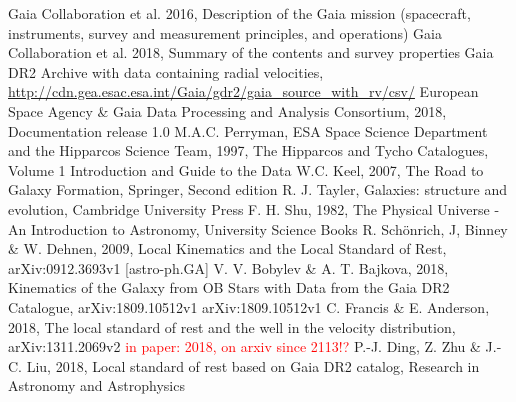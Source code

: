 \documentclass{aastex62}
\begin{document}
	\begin{thebibliography}{}
		
		 Gaia Collaboration et al. 2016, Description of the Gaia mission (spacecraft, instruments, survey and measurement principles, and operations)
		Gaia Collaboration et al. 2018, Summary of the contents and survey properties
		 Gaia DR2 Archive with data containing radial velocities, \url{http://cdn.gea.esac.esa.int/Gaia/gdr2/gaia_source_with_rv/csv/}
		 European Space Agency \& Gaia Data Processing and Analysis Consortium, 2018, Documentation release 1.0
		 M.A.C. Perryman, ESA Space Science Department and the Hipparcos Science Team, 1997, The Hipparcos and Tycho Catalogues, Volume 1 Introduction and Guide to the Data
		W.C. Keel, 2007, The Road to Galaxy Formation, Springer, Second edition
		 R. J. Tayler, Galaxies: structure and evolution, Cambridge University Press
		 F. H. Shu, 1982, The Physical Universe - An Introduction to Astronomy, University Science Books
		 R. Sch\"{o}nrich, J, Binney \& W. Dehnen, 2009, Local Kinematics and the Local Standard of Rest, arXiv:0912.3693v1 [astro-ph.GA]
		 V. V. Bobylev \& A. T. Bajkova, 2018, Kinematics of the Galaxy from OB Stars with Data from the Gaia DR2 Catalogue, arXiv:1809.10512v1 arXiv:1809.10512v1
		 C. Francis \& E. Anderson, 2018, The local standard of rest and the well in the velocity distribution, arXiv:1311.2069v2 \textcolor{red}{in paper: 2018, on arxiv since 2113!?}
		 P.-J. Ding, Z. Zhu \& J.-C. Liu, 2018, Local standard of rest based on Gaia DR2 catalog, Research in Astronomy and Astrophysics
		
	\end{thebibliography}
	
\end{document}
